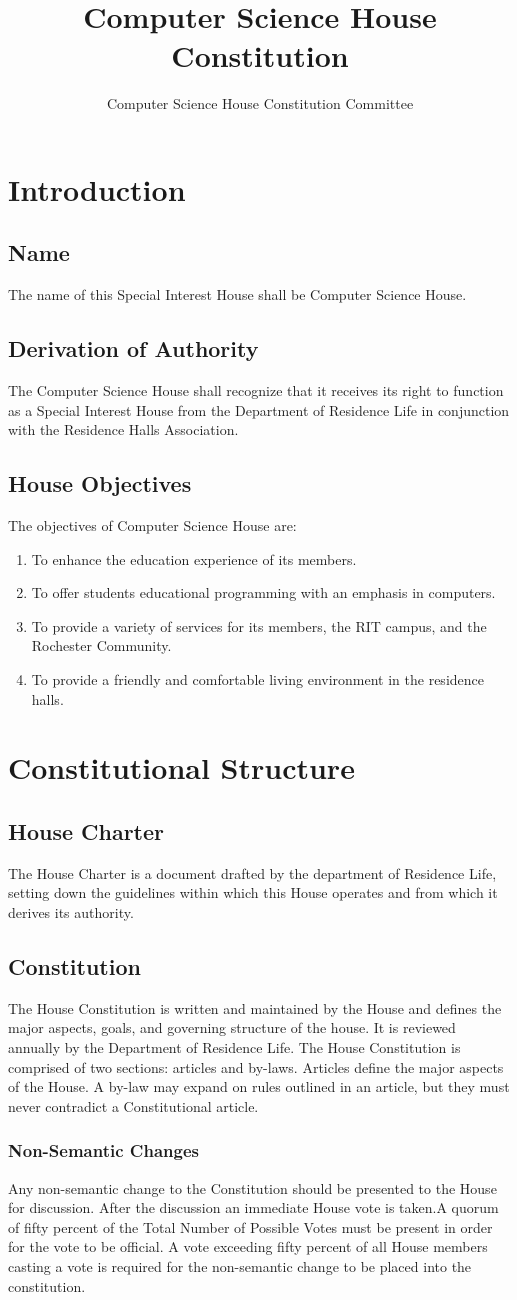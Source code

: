 \documentclass{article}
\title{Computer Science House Constitution}
\author{Computer Science House Constitution Committee}
\date{\datechanged}
\newcommand{\article}[1]{\section{#1} \label{#1}}
\newcommand{\asection}[1]{\subsection{#1} \label{#1}}
\newcommand{\asubsection}[1]{\subsubsection{#1} \label{#1}}
\begin{document}
\maketitle

\article{Introduction}

\asection{Name}
The name of this Special Interest House shall be Computer Science House.

\asection{Derivation of Authority}
The Computer Science House shall recognize that it receives its right to function as a Special Interest House from the Department of Residence Life in conjunction with the Residence Halls Association.

\asection{House Objectives}
The objectives of Computer Science House are:
\begin{enumerate}
	\item To enhance the education experience of its members.
	\item To offer students educational programming with an emphasis in computers.
	\item To provide a variety of services for its members, the RIT campus, and the Rochester Community.
	\item To provide a friendly and comfortable living environment in the residence halls.
\end{enumerate}

\article{Constitutional Structure}

\asection{House Charter}
The House Charter is a document drafted by the department of Residence Life, setting down the guidelines within which this House operates and from which it derives its authority.

\asection{Constitution}
The House Constitution is written and maintained by the House and defines the major aspects, goals, and governing structure of the house. It is reviewed annually by the Department of Residence Life. The House Constitution is comprised of two sections: articles and by-laws. Articles define the major aspects of the House. A by-law may expand on rules outlined in an article, but they must never contradict a Constitutional article.

\asubsection{ Non-Semantic Changes}
Any non-semantic change to the Constitution should be presented to the House for discussion. After the discussion an immediate House vote is taken.A quorum of fifty percent of the Total Number of Possible Votes must be present in order for the vote to be official. A vote exceeding fifty percent of all House members casting a vote is required for the non-semantic change to be placed into the constitution.
\end{document}

